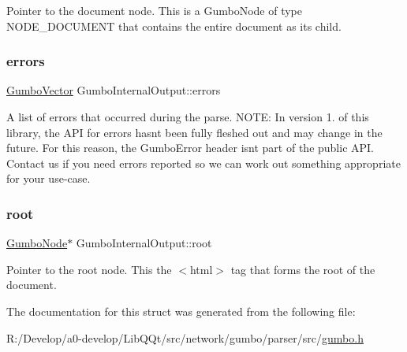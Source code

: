 Pointer to the document node. This is a Gumbo\+Node of type N\+O\+D\+E\+\_\+\+D\+O\+C\+U\+M\+E\+NT that contains the entire document as its child. \mbox{\label{struct_gumbo_internal_output_a8e748fc7e9c1fd09df1ff2dde4bfda45}} 
\subsubsection{\texorpdfstring{errors}{errors}}
{\footnotesize\ttfamily \mbox{\hyperlink{struct_gumbo_vector}{Gumbo\+Vector}} Gumbo\+Internal\+Output\+::errors}

A list of errors that occurred during the parse. N\+O\+TE\+: In version 1. of this library, the A\+PI for errors hasn\textquotesingle{}t been fully fleshed out and may change in the future. For this reason, the Gumbo\+Error header isn\textquotesingle{}t part of the public A\+PI. Contact us if you need errors reported so we can work out something appropriate for your use-\/case. \mbox{\label{struct_gumbo_internal_output_a158c3dc79c61a8b4e0d7d95d2d3f4289}} 
\subsubsection{\texorpdfstring{root}{root}}
{\footnotesize\ttfamily \mbox{\hyperlink{gumbo_8h_a5f67d8397fda8fb7c90cc27f14ac4e7d}{Gumbo\+Node}}$\ast$ Gumbo\+Internal\+Output\+::root}

Pointer to the root node. This the $<$html$>$ tag that forms the root of the document. 

The documentation for this struct was generated from the following file\+:\begin{DoxyCompactItemize}
\item 
R\+:/\+Develop/a0-\/develop/\+Lib\+Q\+Qt/src/network/gumbo/parser/src/\mbox{\hyperlink{gumbo_8h}{gumbo.\+h}}\end{DoxyCompactItemize}
